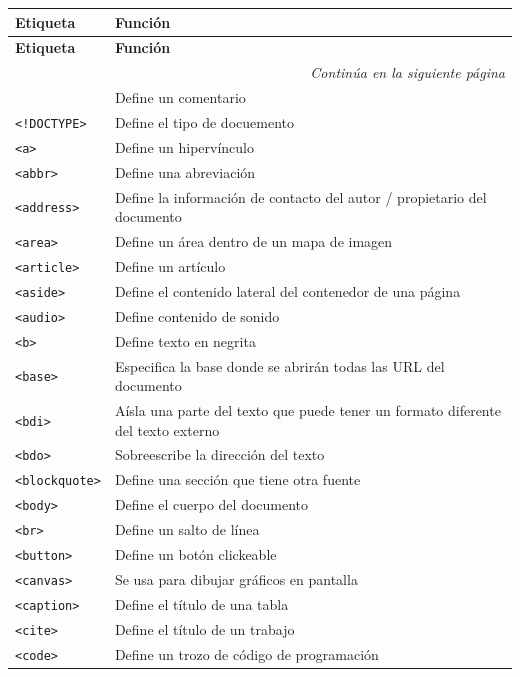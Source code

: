 \documentclass[11pt]{scrartcl}
\begin{document}
\begin{longtable}{|p{}|p{}|}
\hline
\textbf{Etiqueta} & \textbf{Función} \\
\hline
\endfirsthead
\hline
\textbf{Etiqueta} & \textbf{Función} \\
\hline
\endhead
\hline
\multicolumn{2}{|r|}{\small\textit{Continúa en la siguiente página}}\\
\endfoot
\hline
\endlastfoot
\texttt{} & Define un comentario \\
\hline
\texttt{<!DOCTYPE>} & Define el tipo de docuemento \\
\hline
\texttt{<a>} & Define un hipervínculo \\
\hline
\texttt{<abbr>} & Define una abreviación \\
\hline
\texttt{<address>} & Define la información de contacto del autor / propietario del documento \\
\hline
\texttt{<area>} & Define un área dentro de un mapa de imagen \\
\hline
\texttt{<article>} & Define un artículo \\
\hline
\texttt{<aside>} & Define el contenido lateral del contenedor de una página \\
\hline
\texttt{<audio>} & Define contenido de sonido \\
\hline
\texttt{<b>} & Define texto en negrita \\
\hline
\texttt{<base>} & Especifica la base donde se abrirán todas las URL del documento \\
\hline
\texttt{<bdi>} & Aísla una parte del texto que puede tener un formato diferente del texto externo \\
\hline
\texttt{<bdo>} & Sobreescribe la dirección del texto \\
\hline
\texttt{<blockquote>} & Define una sección que tiene otra fuente \\
\hline
\texttt{<body>} & Define el cuerpo del documento \\
\hline
\texttt{<br>} & Define un salto de línea \\
\hline
\texttt{<button>} & Define un botón clickeable \\
\hline
\texttt{<canvas>} & Se usa para dibujar gráficos en pantalla \\
\hline
\texttt{<caption>} & Define el título de una tabla \\
\hline
\texttt{<cite>} & Define el título de un trabajo \\
\hline
\texttt{<code>} & Define un trozo de código de programación \\

\end{longtable}
\end{document}
